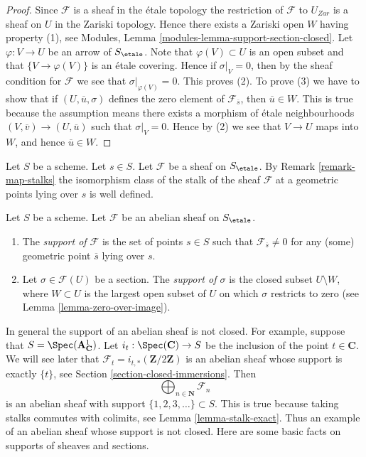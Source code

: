 \begin{proof}
Since $\mathcal{F}$ is a sheaf in the \'etale topology the restriction of
$\mathcal{F}$ to $U_{Zar}$ is a sheaf on $U$ in the Zariski topology.
Hence there exists a Zariski open $W$ having property (1), see
Modules, Lemma \ref{modules-lemma-support-section-closed}. Let
$\varphi : V \to U$ be an arrow of $S_\etale$. Note that
$\varphi(V) \subset U$ is an open subset and that
$\{V \to \varphi(V)\}$ is an \'etale covering. Hence if
$\sigma|_V = 0$, then by the sheaf condition for $\mathcal{F}$ we
see that $\sigma|_{\varphi(V)} = 0$. This proves (2).
To prove (3) we have to show that if $(U, \overline{u}, \sigma)$
defines the zero element of $\mathcal{F}_{\overline{s}}$, then
$\overline{u} \in W$. This is true because the assumption means
there exists a morphism of \'etale neighbourhoods
$(V, \overline{v}) \to (U, \overline{u})$ such that
$\sigma|_V = 0$. Hence by (2) we see that $V \to U$ maps into $W$, and
hence $\overline{u} \in W$.
\end{proof}

\noindent
Let $S$ be a scheme. Let $s \in S$.
Let $\mathcal{F}$ be a sheaf on $S_\etale$. By
Remark \ref{remark-map-stalks}
the isomorphism class of the stalk of the sheaf $\mathcal{F}$
at a geometric points lying over $s$ is well defined.

\begin{definition}
\label{definition-support}
Let $S$ be a scheme.
Let $\mathcal{F}$ be an abelian sheaf on $S_\etale$.
\begin{enumerate}
\item The {\it support of $\mathcal{F}$} is the set of
points $s \in S$ such that $\mathcal{F}_{\overline{s}} \not = 0$
for any (some) geometric point $\overline{s}$ lying over $s$.
\item Let $\sigma \in \mathcal{F}(U)$ be a section.
The {\it support of $\sigma$} is the closed subset $U \setminus W$, where
$W \subset U$ is the largest open subset of $U$ on which $\sigma$
restricts to zero (see
Lemma \ref{lemma-zero-over-image}).
\end{enumerate}
\end{definition}

\noindent
In general the support of an abelian sheaf is not closed.
For example, suppose that $S = \Spec(\mathbf{A}^1_{\mathbf{C}})$.
Let $i_t : \Spec(\mathbf{C}) \to S$ be the inclusion of the
point $t \in \mathbf{C}$.
We will see later that $\mathcal{F}_t = i_{t, *}(\mathbf{Z}/2\mathbf{Z})$
is an abelian sheaf whose support is exactly $\{t\}$, see
Section \ref{section-closed-immersions}.
Then
$$
\bigoplus\nolimits_{n \in \mathbf{N}} \mathcal{F}_n
$$
is an abelian sheaf with support $\{1, 2, 3, \ldots\} \subset S$.
This is true because taking stalks commutes with colimits, see
Lemma \ref{lemma-stalk-exact}.
Thus an example of an abelian sheaf whose support is not closed.
Here are some basic facts on supports of sheaves and sections.

